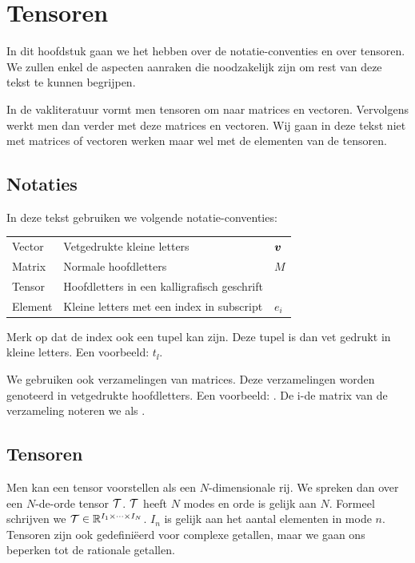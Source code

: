 \chapter{Tensoren}
\label{h:tensoren}
In dit hoofdstuk gaan we het hebben over de notatie-conventies en over tensoren. We zullen enkel de aspecten aanraken die noodzakelijk zijn om rest van deze tekst te kunnen begrijpen.

In de vakliteratuur vormt men tensoren om naar matrices en vectoren. Vervolgens werkt men dan verder met deze matrices en vectoren. Wij gaan in deze tekst niet met matrices of vectoren werken maar wel met de elementen van de tensoren. 


\section{Notaties}
In deze tekst gebruiken we volgende notatie-conventies:

\begin{tabular}{l l l}
    Vector						& Vetgedrukte kleine letters					& $\boldsymbol{v}$\\
    Matrix 						& Normale hoofdletters							& $M$\\
    Tensor 						& Hoofdletters in een kalligrafisch geschrift	& \TT\\
    Element						& Kleine letters met een index in subscript	& $e_i$\\
\end{tabular}

Merk op dat de index ook een tupel kan zijn. Deze tupel is dan vet gedrukt in kleine letters. Een voorbeeld: $t_{\ii}$.

We gebruiken ook verzamelingen van matrices. Deze verzamelingen worden genoteerd in vetgedrukte hoofdletters. Een voorbeeld: \UUU{}. De i-de matrix van de verzameling \UUU{} noteren we als .

\section{Tensoren}
Men kan een tensor voorstellen als een $N$-dimensionale rij. We spreken dan over een $N$-de-orde tensor $\mathcal{T}$. $\mathcal{T}$ heeft $N$ modes en orde is gelijk aan $N$. Formeel schrijven we $\mathcal{T} \in \mathbb{R}^{I_1 \times \dotsb \times I_N}$. $I_n$ is gelijk aan het aantal elementen in mode $n$. Tensoren zijn ook gedefini\"eerd voor complexe getallen, maar we gaan ons beperken tot de rationale getallen.

